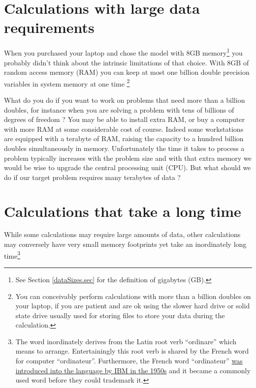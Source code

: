 \section{Calculations with large data requirements}

When you purchased your laptop and chose the model with 8GB memory\footnote{See Section \ref{dataSizes.sec} for the definition of gigabytes (GB).} you probably didn't think about the intrinsic limitations of that choice. With 8GB of random access memory (RAM) you can keep at most  one billion double precision variables in system memory at one time \footnote{You can conceivably perform calculations with more than a billion doubles on your laptop, if you are patient and are ok using the slower hard drive or solid state drive usually used for storing files to store your data during the calculation.} 

What do you do if you want to work on problems that need more than a billion doubles, for instance when you are solving a problem with tens of billions of degrees of freedom ? You may be able to install extra RAM, or buy a computer with more RAM at some considerable cost of course. Indeed some workstations are equipped with a terabyte of RAM, raising the capacity to a hundred billion doubles simultaneously in memory. Unfortunately the time it takes to process a problem typically  increases with the problem size and with that extra memory we would be wise to upgrade the central processing unit (CPU). But what should we do if our target problem requires many terabytes of data ?

\section{Calculations that take a long time}

While some calculations may require large amounts of data, other calculations may conversely have very small memory footprints yet take an inordinately long time\footnote{The word inordinately derives from the Latin root verb ``ordinare'' which means to arrange. Entertainingly this root verb is shared by the French word for computer ``ordinateur''. Furthermore, the French word ``ordinateur'' \href{https://blogs.transparent.com/french/the-origin-of-lordinateur-computers-in-french/}{was introduced into the language by IBM in the 1950s} and it became a commonly used word before they could trademark it.} 

